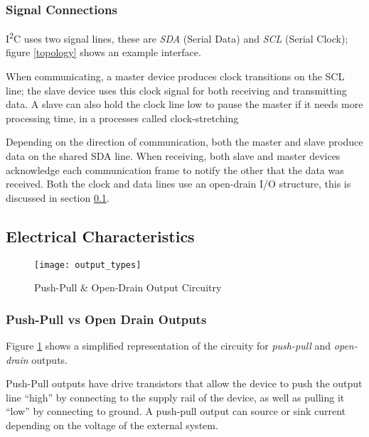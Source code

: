 \documentclass[openany,11pt,fleqn]{book} %
\begin{document}
        \subsubsection{\color{orange}Signal Connections}
            I\textsuperscript{2}C uses two signal lines, these are \textit{SDA} (Serial Data) and \textit{SCL} (Serial Clock); figure \ref{topology} shows an example interface. 
            
            When communicating, a master device produces clock transitions on the SCL line; the slave device uses this clock signal for both receiving and transmitting data. A slave can also hold the clock line low to pause the master if it needs more processing time, in a processes called clock-stretching
            
            Depending on the direction of communication, both the master and slave produce data on the shared SDA line. When receiving, both slave and master devices acknowledge each communication frame to notify the other that the data was received.  Both the clock and data lines use an open-drain I/O structure, this is discussed in section \ref{electrical}. 
            
    \subsection{\color{orange}Electrical Characteristics} \label{electrical}
        \begin{figure}[]
            \centering\texttt{[image: output\_types]}
            \caption{Push-Pull \& Open-Drain Output Circuitry}
            \label{output_circuit}
        \end{figure}
        
        \subsubsection{\color{orange}Push-Pull vs Open Drain Outputs}
        Figure \ref{output_circuit} shows a simplified representation of the circuity for \textit{push-pull} and \textit{open-drain} outputs. 
        
        
        Push-Pull outputs have drive transistors that allow the device to push the output line ``high'' by connecting to the supply rail of the device, as well as pulling it ``low'' by connecting to ground. A push-pull output can source or sink current depending on the voltage of the external system. 
        
\end{document}
